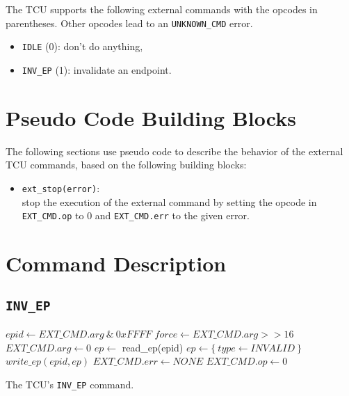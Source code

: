 The TCU supports the following external commands with the opcodes in parentheses. Other opcodes lead
to an \texttt{UNKNOWN\_CMD} error.

\begin{itemize}
  \item \texttt{IDLE} (0): don't do anything,
  \item \texttt{INV\_EP} (1): invalidate an endpoint.
\end{itemize}

\section{Pseudo Code Building Blocks}
\label{sec:extcmdspseudo}

The following sections use pseudo code to describe the behavior of the external TCU commands, based
on the following building blocks:

\begin{itemize}
  \item \texttt{ext\_stop(error)}:\\
  stop the execution of the external command by setting the opcode in \texttt{EXT\_CMD.op} to 0 and
  \texttt{EXT\_CMD.err} to the given error.
\end{itemize}

\section{Command Description}

\subsection{\texttt{INV\_EP}}

\begin{algorithm}[H]
    $epid \gets EXT\_CMD.arg\ \&\ 0xFFFF$\;
    $force \gets EXT\_CMD.arg >> 16$\;
    \BlankLine
    $EXT\_CMD.arg \gets 0$\;
    \BlankLine
    $ep \gets$ read\_ep(epid)\;
    \BlankLine
    $ep \gets \{~type \gets INVALID~\}$\;
    $write\_ep(epid, ep)$\;
    \BlankLine
    $EXT\_CMD.err \gets NONE$\;
    $EXT\_CMD.op \gets 0$\;
    \caption{The TCU's \texttt{INV\_EP} command.}
\end{algorithm}
